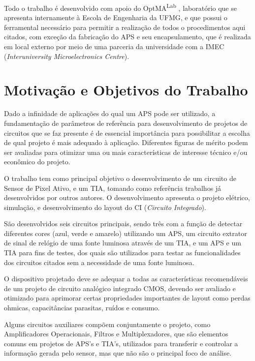 Todo o trabalho é desenvolvido com apoio do OptMA\textsuperscript{Lab} , laboratório que se apresenta internamente à
Escola de Engenharia da UFMG, e que possui o ferramental necessário para permitir a realização de todos o procedimentos
aqui citados, com exceção da fabricação do APS e seu encapsulamento, que é realizada em local externo por meio de uma
parceria da universidade com a IMEC (\textit{Interuniversity Microelectronics Centre}).

\section{Motivação e Objetivos do Trabalho}

Dado a infinidade de aplicações do qual um APS pode ser utilizado, a fundamentação de parâmetros de referência para
desenvolvimento de projetos de circuitos que se faz presente é de essencial importância para possibilitar a escolha de
qual projeto é mais adequado à aplicação. Diferentes figuras de mérito podem ser avaliadas para otimizar uma ou mais
características de interesse técnico e/ou econômico do projeto.

O trabalho tem como principal objetivo o desenvolvimento de um circuito de Sensor de Pixel Ativo, e um TIA, tomando como
referência trabalhos j\'a desenvolvidos por outros autores. O desenvolvimento apresenta o projeto elétrico, simulação, e
desenvolvimento do layout do CI (\textit{Circuito Integrado}). 

São desenvolvidos seis circuitos principais, sendo três com a função de detectar diferentes cores (azul, verde e
amarelo) utilizando um APS, um circuito extrator de sinal de relógio de uma fonte luminosa atrav\'es de um TIA, e um APS
e um TIA para fins de testes, dos quais são utilizados para testar as funcionalidades dos circuitos citados sem a
necessidade de uma fonte luminosa. 

O dispositivo projetado deve se adequar a todas as características recomendáveis de um projeto de circuito analógico
integrado CMOS, devendo ser avaliado e otimizado para aprimorar certas propriedades importantes de layout como perdas
ohmicas, capacitâncias parasitas, ruídos e consumo.

Alguns circuitos auxiliares compõem conjuntamente o projeto, como Amplificadores Operacionais, Filtros e
Multiplexadores, que são elementos comuns em projetos de APS’s e TIA's, utilizados para transferir e controlar a
informação gerada pelo sensor, mas que não são o principal foco de análise.

